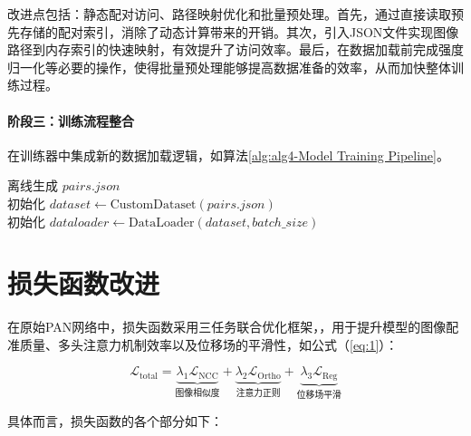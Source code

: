 改进点包括：静态配对访问、路径映射优化和批量预处理。首先，通过直接读取预先存储的配对索引，消除了动态计算带来的开销。其次，引入JSON文件实现图像路径到内存索引的快速映射，有效提升了访问效率。最后，在数据加载前完成强度归一化等必要的操作，使得批量预处理能够提高数据准备的效率，从而加快整体训练过程。



\paragraph{阶段三：训练流程整合}
在训练器中集成新的数据加载逻辑，如算法\ref{alg:alg4-Model Training Pipeline}。
\begin{algorithm}

    \label{alg:alg4-Model Training Pipeline}

    离线生成 $pairs.json$ \\
    初始化 $dataset \gets \text{CustomDataset}(pairs.json)$ \\
    初始化 $dataloader \gets \text{DataLoader}(dataset, batch\_size)$ \\
\end{algorithm}


\section{损失函数改进}

在原始PAN网络中，损失函数采用三任务联合优化框架，，用于提升模型的图像配准质量、多头注意力机制效率以及位移场的平滑性，如公式（\ref{eq:1}）：

\begin{equation}
    \mathcal{L}_{\text{total}} = \underbrace{\lambda_1 \mathcal{L}_{\text{NCC}}}_{\text{图像相似度}} + \underbrace{\lambda_2 \mathcal{L}_{\text{Ortho}}}_{\text{注意力正则}} + \underbrace{\lambda_3 \mathcal{L}_{\text{Reg}}}_{\text{位移场平滑}}
    \label{eq:1}
\end{equation}

具体而言，损失函数的各个部分如下：

